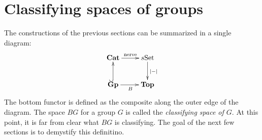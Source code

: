 \section{Classifying spaces of groups}
%
The constructions of the previous sections can be summarized in a single
diagram:
\begin{equation*}
    \xymatrix{
	\Cat\ar[r]^{\text{nerve}} & s\Set\ar[d]^{|-|}\\
	\mathbf{Gp}\ar@{^(->}[u]\ar[r]_{B} & \Top
    }
\end{equation*}
The bottom functor is defined as the composite along the outer edge of the
diagram. The space $BG$ for a group $G$ is called the \emph{classifying space
of $G$}. At this point, it is far from clear what $BG$ is classifying. The goal
of the next few sections is to demystify this definitino.


